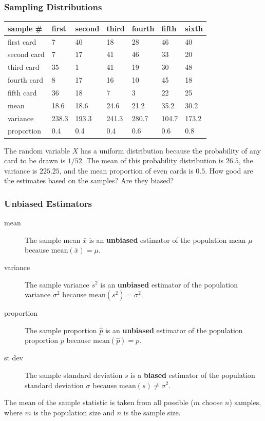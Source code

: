 \documentclass[xcolor=dvipsnames]{beamer}
\begin{document}
\begin{frame}
  \frametitle{Sampling Distributions}
\begin{tabular}{|l|l|l|l|l|l|l|}\hline
  sample \#   & first & second & third & fourth & fifth & sixth \\ \hline
  first card  & 7     & 40     & 18    & 28     & 46    & 40    \\ \hline
  second card & 7     & 17     & 41    & 46     & 33    & 20    \\ \hline
  third card  & 35    & 1      & 41    & 19     & 30    & 48    \\ \hline
  fourth card & 8     & 17     & 16    & 10     & 45    & 18    \\ \hline
  fifth card  & 36    & 18     & 7     & 3      & 22    & 25    \\ \hline
  mean        & 18.6  & 18.6   & 24.6  & 21.2   & 35.2  & 30.2  \\ \hline
  variance    & 238.3 & 193.3  & 241.3 & 280.7  & 104.7 & 173.2 \\ \hline
  proportion  & 0.4   & 0.4    & 0.4   & 0.6    & 0.6   & 0.8   \\ \hline
\end{tabular}

\medskip

The random variable $X$ has a \alert{uniform distribution} because
the probability of any card to be drawn is $1/52$. The mean of
this probability distribution is $26.5$, the variance is $225.25$,
and the mean proportion of even cards is $0.5$. How good are the
estimates based on the samples? Are they biased?
\end{frame}

\begin{frame}
  \frametitle{Unbiased Estimators}
  \begin{description}
  \item[mean] The \alert{sample mean $\bar{x}$} is an \textbf{unbiased}
    estimator of the \alert{population mean $\mu$} because
  $\mbox{mean}(\bar{x})=\mu$.
\item[variance] The \alert{sample variance $s^{2}$} is an \textbf{unbiased}
    estimator of the \alert{population variance $\sigma^{2}$} because
  $\mbox{mean}(s^{2})=\sigma^{2}$.
\item[proportion] The \alert{sample proportion $\hat{p}$} is an \textbf{unbiased}
    estimator of the \alert{population proportion $p$} because
  $\mbox{mean}(\hat{p})=p$.
\item[st dev] The \alert{sample standard deviation $s$} is a \textbf{biased}
    estimator of the \alert{population standard deviation $\sigma$} because
  $\mbox{mean}(s)\neq\sigma^{2}$.
  \end{description}
  The mean of the sample statistic is taken from all possible ($m$
  choose $n$) samples, where $m$ is the population size and $n$ is the
  sample size.
\end{frame}
\end{document}
